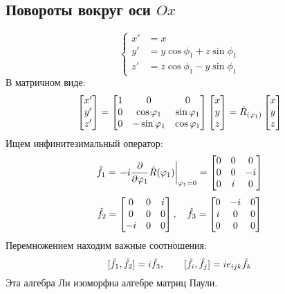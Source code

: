 \subsection{Повороты вокруг оси $Ox$}
$$
    \begin{cases}
        x' &= x\\
        y' &= y \cos \phi_1 + z \sin \phi_1\\
        z' &= z \cos \phi_1 - y \sin \phi_1
    \end{cases}
$$
В матричном виде:
$$
    \begin{bmatrix}
      x' \\
      y' \\
      z' \\
    \end{bmatrix}
    =
    \begin{bmatrix}
      1 & 0 & 0 \\
      0 & \cos \phi_1 & \sin \phi_1 \\
      0 & -\sin \phi_1 & \cos \phi_1 \\
    \end{bmatrix}
    \begin{bmatrix}
      x \\
      y \\
      z \\
    \end{bmatrix}
    = 
    \Hat R_{(\phi_1)}
        \begin{bmatrix}
      x \\
      y \\
      z \\
    \end{bmatrix}
$$
Ищем инфинитезимальный оператор:
$$
    \Hat f_1 =\left. -i \ud{}{\phi_1} \Hat R (\phi_1) \right|_{\phi_1 = 0}
    =
    \begin{bmatrix}
      0 & 0 & 0 \\
      0 & 0 & -i \\
      0 & i & 0 \\
    \end{bmatrix}
$$
$$
    \Hat f_2 =
    \begin{bmatrix}
      0 & 0 & i \\
      0 & 0 & 0 \\
      -i & 0 & 0 \\
    \end{bmatrix}, \quad 
    \Hat f_3 =
    \begin{bmatrix}
      0 & -i & 0 \\
      i & 0 & 0 \\
      0 & 0 & 0 \\
    \end{bmatrix}    
$$
Перемножением находим важные соотношения:
$$
    [\hat f_1, \hat f_2] = i \hat f_3, \qquad [\Hat f_i, \Hat f_j] = i e_{ijk} \Hat f_k
$$
Эта алгебра Ли изоморфна алгебре матриц Паули.
